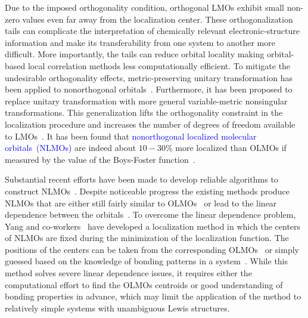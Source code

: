 \documentclass[aps,prl,reprint,amsmath,amssymb]{revtex4-1}
\begin{document}
Due to the imposed orthogonality condition, orthogonal LMOs exhibit small non-zero values even far away from the localization center. 
These orthogonalization tails can complicate the interpretation of chemically relevant electronic-structure information and make its transferability from one system to another more difficult. 
More importantly, the tails can reduce orbital locality making orbital-based local correlation methods less computationally efficient.
To mitigate the undesirable orthogonality effects, metric-preserving unitary transformation has been applied to nonorthogonal orbitals~\cite{hoyvik2017generalising}. 
Furthermore, it has been proposed to replace unitary transformation with more general variable-metric nonsingular transformations. 
This generalization lifts the orthogonality constraint in the localization procedure and increases the number of degrees of freedom available to LMOs~\cite{anderson1968self, diner1968fully, magnasco1974localized, payne1977hartree, mehler1977self, feng2004An_efficient, cui2010efficient}. 
It has been found that \textcolor{blue}{nonorthogonal localized molecular orbitals~(NLMOs)} are indeed about $10-30 \%$ more localized than OLMOs if measured by the value of the Boys-Foster function~\cite{feng2004An_efficient, liu2000nonorthogonal}. 

Substantial recent efforts have been made to develop reliable algorithms to construct NLMOs~\cite{feng2004An_efficient, liu2000nonorthogonal, peng2013effective, hoyvik2017generalising}. 
Despite noticeable progress the existing methods produce NLMOs that are either still fairly similar to OLMOs~\cite{sundberg1979variationally} or lead to the linear dependence between the orbitals~\cite{feng2004An_efficient}. 
To overcome the linear dependence problem, Yang and co-workers~\cite{feng2004An_efficient, cui2010efficient} have developed a localization method in which the centers of NLMOs are fixed during the minimization of the localization function. 
The positions of the centers can be taken from the corresponding OLMOs~\cite{feng2004An_efficient} or simply guessed based on the knowledge of bonding patterns in a system~\cite{cui2010efficient}. %
While this method solves severe linear dependence issues, it requires either the computational effort to find the OLMOs centroids or good understanding of bonding properties in advance, which may limit the application of the method to relatively simple systems with unambiguous Lewis structures.
\end{document}
